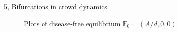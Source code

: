\begin{task}{5, Bifurcations in crowd dynamics}
\begin{figure}[H]
\centering
{}
\caption{Plots of disease-free equilibrium $\mathbb{E}_0=(A/d, 0,0)$}
\label{fig:t5_6-plots}
\end{figure}


\end{task}
